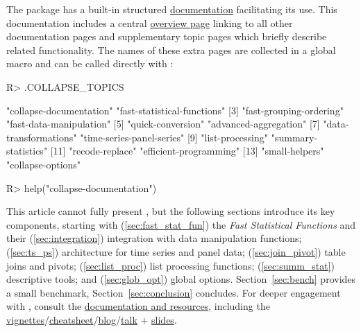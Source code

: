 \documentclass[nojss]{jss} %
\begin{document}
The package has a built-in structured \href{https://sebkrantz.github.io/collapse/reference/index.html}{documentation} facilitating its use. This documentation includes a central \href{https://sebkrantz.github.io/collapse/reference/collapse-documentation.html}{overview page} linking to all other documentation pages and supplementary topic pages which briefly describe related functionality. The names of these extra pages are collected in a global macro  and can be called directly with :
%
\begin{Schunk}
\begin{Sinput}
R> .COLLAPSE_TOPICS
\end{Sinput}
\begin{Soutput}
 [1] "collapse-documentation"     "fast-statistical-functions"
 [3] "fast-grouping-ordering"     "fast-data-manipulation"    
 [5] "quick-conversion"           "advanced-aggregation"      
 [7] "data-transformations"       "time-series-panel-series"  
 [9] "list-processing"            "summary-statistics"        
[11] "recode-replace"             "efficient-programming"     
[13] "small-helpers"              "collapse-options"          
\end{Soutput}
\begin{Sinput}
R> help("collapse-documentation")
\end{Sinput}
\end{Schunk}
%
This article cannot fully present , but the following sections introduce its key components, starting with (\ref{sec:fast_stat_fun}) the \emph{Fast Statistical Functions} and their (\ref{sec:integration}) integration with data manipulation functions; (\ref{sec:ts_ps}) architecture for time series and panel data; (\ref{sec:join_pivot}) table joins and pivots; (\ref{sec:list_proc}) list processing functions; (\ref{sec:summ_stat}) descriptive tools; and (\ref{sec:glob_opt}) global options. Section~\ref{sec:bench} provides a small benchmark, Section~\ref{sec:conclusion} concludes. For deeper engagement with , consult the \href{https://sebkrantz.github.io/collapse/articles/collapse_documentation.html}{documentation and resources}, including the \href{https://sebkrantz.github.io/collapse/articles/index.html}{vignettes}/\href{https://raw.githubusercontent.com/SebKrantz/collapse/master/misc/collapse\%20cheat\%20sheet/collapse_cheat_sheet.pdf}{cheatsheet}/\href{https://sebkrantz.github.io/Rblog/}{blog}/\href{https://www.youtube.com/watch?v=OwWT1-dSEts}{talk} $+$ \href{https://raw.githubusercontent.com/SebKrantz/collapse/master/misc/useR2022\%20presentation/collapse_useR2022_final.pdf}{slides}.
%
\end{document}
